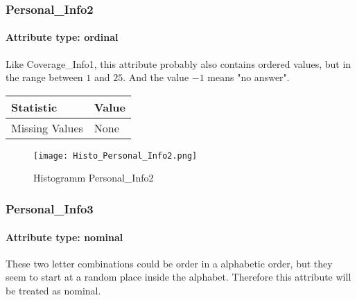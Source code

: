 \subsubsection{Personal\_Info2}
\paragraph{Attribute type: ordinal} Like Coverage\_Info1, this attribute probably also contains ordered values, but in the range between $1$ and $25$. And the value $-1$ means "no answer". 

\begin{table}[H]
	\renewcommand{\arraystretch}{1.25}
	\begin{tabular}{l|l}
		\textbf{Statistic} & \textbf{Value}\\\hline
		Missing Values& None\\\hline
	\end{tabular}
\end{table}
\begin{figure}[H]
	\begin{center}
		\texttt{[image: Histo\_Personal\_Info2.png]}
	\end{center}
	\caption{Histogramm Personal\_Info2}
\end{figure}

\subsubsection{Personal\_Info3}
\paragraph{Attribute type: nominal} These two letter combinations could be order in a alphabetic order, but they seem to start at a random place inside the alphabet. Therefore this attribute will be treated as nominal.

